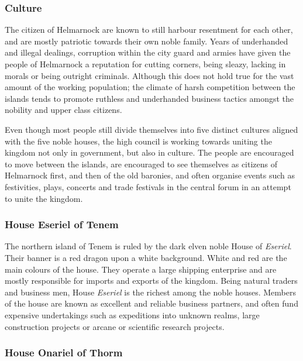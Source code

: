 \subsubsection{Culture}


The citizen of Helmarnock are known to still harbour resentment for each other,
and are mostly patriotic towards their own noble family. Years of underhanded
and illegal dealings, corruption within the city guard and armies have given
the people of Helmarnock a reputation for cutting corners, being sleazy,
lacking in morals or being outright criminals. Although this does not hold
true for the vast amount of the working population; the climate of harsh
competition between the islands tends to promote ruthless and underhanded
business tactics amongst the nobility and upper class citizens.

Even though most people still divide themselves into five distinct cultures
aligned with the five noble houses, the high council is working towards
uniting the kingdom not only in government, but also in culture. The people
are encouraged to move between the islands, are encouraged to see themselves
as citizens of Helmarnock first, and then of the old baronies, and often
organise events such as festivities, plays, concerts and trade festivals in
the central forum in an attempt to unite the kingdom.

\subsubsection{House Eseriel of Tenem}
\label{sec:House Eseriel}

The northern island of Tenem is ruled by the dark elven noble House of
\emph{Eseriel}. Their banner is a red dragon upon a white background. White
and red are the main colours of the house. They operate a large shipping
enterprise and are mostly responsible for imports and exports of the
kingdom. Being natural traders and business men, House \emph{Eseriel} is the
richest among the noble houses. Members of the house are known as excellent
and reliable business partners, and often fund expensive undertakings such
as expeditions into unknown realms, large construction projects or arcane
or scientific research projects.

\subsubsection{House Onariel of Thorm}
\label{sec:House Onariel}

